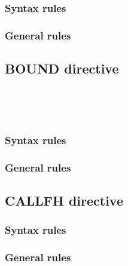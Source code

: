 \subsubsection{Syntax rules}

\subsubsection{General rules}

\subsection{BOUND directive}

\begin{syntax}[\miscextcolour]
   \\
\end{syntax}

\begin{syntax}[\miscextcolour]
  \begin{1=}
     \\
  \end{1=}
\end{syntax}

\subsubsection{Syntax rules}

\subsubsection{General rules}

\subsection{CALLFH directive}

\begin{syntax}[\miscextcolour]
  \begin{0-1}
    \literal
  \end{0-1}
\end{syntax}

\subsubsection{Syntax rules}

\subsubsection{General rules}

